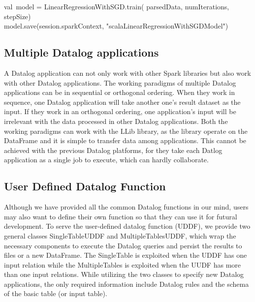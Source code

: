 val\ model = LinearRegressionWithSGD.train(
parsedData,
numIterations,
stepSize)\\

model.save(session.sparkContext, "scalaLinearRegressionWithSGDModel")\\


\eldl



\subsection{Multiple Datalog applications}
A Datalog application can not only work with other Spark libraries but also work with other Datalog applications. The working paradigms of multiple Datalog applications can be in sequential or orthogonal ordering. When they work in sequence, one Datalog application will take another one's result dataset as the input. If they work in an orthogonal ordering, one application's input will be irrelevant with the data processed in other Datalog applications. Both the working paradigms can work with the LLib library, as the library operate on the DataFrame and it is simple to transfer data among applications. This cannot be achieved with the previous Datalog platforms, for they take each Datlog application as a single job to execute, which can hardly collaborate. 

\subsection{User Defined Datalog Function}
Although we have provided all the common Datalog functions in our mind, users may also want to define their own function so that they can use it for futural development. To serve the user-defined datalog function (UDDF), we provide two general classes SingleTableUDDF and MultipleTablesUDDF, which wrap the necessary components to execute the Datalog queries and persist the results to files or a new DataFrame.  The SingleTable is exploited when the UDDF has one input relation while the MultipleTables is exploited when the UUDF has more than one input relations. While utilizing the two classes to specify new Datalog applications, the only required information include Datalog rules and the schema of the basic table (or input table).  

